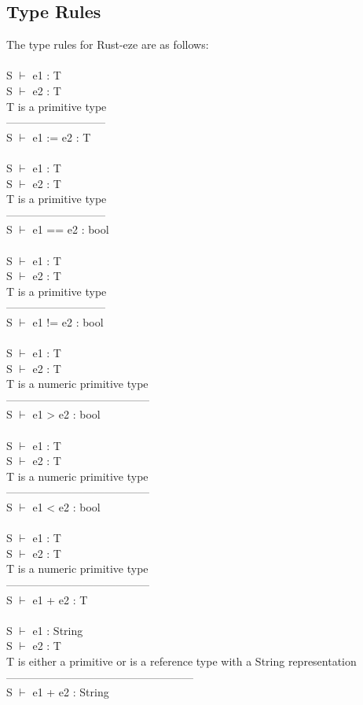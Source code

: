 \documentclass[letterpaper, 10pt, DIV=13]{scrartcl}
\numberwithin{equation}{section}
\numberwithin{figure}{section}
\numberwithin{table}{section}
\begin{document}
\subsection{Type Rules}
The type rules for Rust-eze are as follows: \\ \\
S $\vdash$ e1 : T \\
S $\vdash$ e2 : T \\
T is a primitive type \\
--------------------------- \\
S $\vdash$ e1 := e2 : T \\
\\
S $\vdash$ e1 : T \\
S $\vdash$ e2 : T \\
T is a primitive type \\
--------------------------- \\
S $\vdash$ e1 == e2 : bool \\
\\
S $\vdash$ e1 : T \\
S $\vdash$ e2 : T \\
T is a primitive type \\
--------------------------- \\
S $\vdash$ e1 != e2 : bool \\
\\
S $\vdash$ e1 : T \\
S $\vdash$ e2 : T \\
T is a numeric primitive type \\
--------------------------------------- \\
S $\vdash$ e1 > e2 : bool \\
\\
S $\vdash$ e1 : T \\
S $\vdash$ e2 : T \\
T is a numeric primitive type \\
--------------------------------------- \\
S $\vdash$ e1 < e2 : bool \\
\\
S $\vdash$ e1 : T \\
S $\vdash$ e2 : T \\
T is a numeric primitive type \\
--------------------------------------- \\
S $\vdash$ e1 + e2 : T \\
\\
S $\vdash$ e1 : String \\
S $\vdash$ e2 : T \\
T is either a primitive or is a reference type with a String representation \\
--------------------------------------------------- \\
S $\vdash$ e1 + e2 : String
\end{document}
